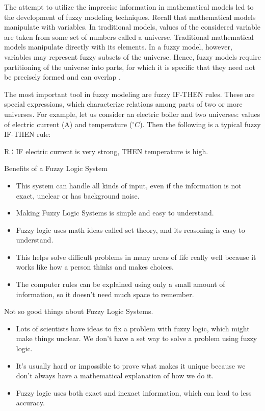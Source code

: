 The attempt to utilize the imprecise information in mathematical models led to the
development of fuzzy modeling techniques. Recall that mathematical models manipulate with variables. In traditional models, values of the considered variable are taken
from some set of numbers called a universe. Traditional mathematical models manipulate directly with its elements. In a fuzzy model, however, variables may represent
fuzzy subsets of the universe. Hence, fuzzy models require partitioning of the universe into parts, for which it is specific that they need not be precisely formed and
can overlap \cite{NOPEDV16}.

The most important tool in fuzzy modeling are fuzzy IF-THEN rules. These are
special expressions, which characterize relations among parts of two or more universes. For example, let us consider an electric boiler and two universes: values
of electric current (A) and temperature  (\(^\circ  C \)). Then the following is a typical fuzzy
IF-THEN rule:

R ∶ IF electric current is very strong, THEN temperature is high.

Benefits of a Fuzzy Logic System
\begin{itemize}
    \item This system can handle all kinds of input, even if the information is not exact, unclear or has background noise.
\item Making Fuzzy Logic Systems is simple and easy to understand.
\item Fuzzy logic uses math ideas called set theory, and its reasoning is easy to understand.
\item This helps solve difficult problems in many areas of life really well because it works like how a person thinks and makes choices.
\item The computer rules can be explained using only a small amount of information, so it doesn't need much space to remember.
\end{itemize}

Not so good things about Fuzzy Logic Systems.
\begin{itemize}
    \item Lots of scientists have ideas to fix a problem with fuzzy logic, which might make things unclear. We don't have a set way to solve a problem using fuzzy logic.
    \item It's usually hard or impossible to prove what makes it unique because we don't always have a mathematical explanation of how we do it.
\item Fuzzy logic uses both exact and inexact information, which can lead to less accuracy.
\end{itemize}

